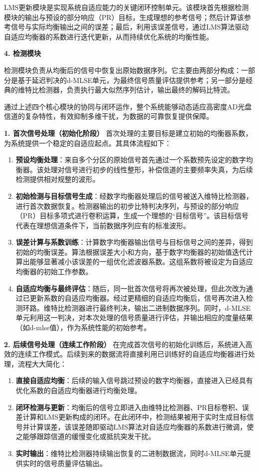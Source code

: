 LMS更新模块是实现系统自适应能力的关键闭环控制单元。该模块首先根据检测模块的输出与预设的部分响应（PR）目标，生成理想的参考信号；然后计算该参考信号与实际均衡输出之间的误差；最后，利用该误差信号，通过LMS算法驱动自适应均衡器的系数进行迭代更新，从而持续优化系统的均衡性能。

\textbf{4. 检测模块}

检测模块负责从均衡后的信号中恢复出原始数据序列。它主要由两部分构成：一部分是基于延迟判决的d-MLSE单元，为最终信号质量评估提供参考；另一部分是经典的维特比检测器，负责执行最大似然序列估计，输出最终的解码比特流。

通过上述四个核心模块的协同与闭环运作，整个系统能够动态适应高密度AD光盘信道的复杂特性，有效抑制多维干扰，为数据的可靠恢复提供保障。


\textbf{1. 首次信号处理（初始化阶段）}
首次处理的主要目标是建立初始的均衡器系数，为系统提供一个稳定的自适应起点。其具体流程如下：
\begin{enumerate}
	\item \textbf{预设均衡处理}：来自多个分区的原始信号首先通过一个系数预先设定的数字均衡器。该处理对信号进行初步的线性整形，补偿信道的主要频率失真，为后续检测提供相对规整的波形。
	\item \textbf{初始检测与目标信号生成}：经数字均衡器处理后的信号被送入维特比检测器，进行首次数据恢复。检测器输出的初步比特判决序列，与预设的部分响应（PR）目标多项式进行卷积运算，生成一个理想的“目标信号”。该目标信号代表在理想信道条件下，当前数据序列应有的标准波形。
	\item \textbf{误差计算与系数训练}：计算数字均衡器输出信号与目标信号之间的差异，得到初始的均衡误差。算法根据误差大小和方向，基于数字均衡器的初始值迭代计算出能够显著减小该误差的一组优化滤波器系数。这组系数将被设定为自适应均衡器的初始工作参数。
	\item \textbf{自适应均衡与最终评估}：随后，同一批首次信号将再次被处理，但此次改为通过已更新系数的自适应均衡器。经过更精细的自适应均衡后，信号再次进入检测环路。维特比检测器进行最终判决，输出二进制数据序列。同时，d-MLSE 单元利用这一判决，对本次处理的信号质量进行评估，并输出相应的度量结果（如d-mlse值），作为系统性能的初始参考。
\end{enumerate}

\textbf{2. 后续信号处理（连续工作阶段）}
在完成首次信号的初始化训练后，系统进入高效的连续工作模式。后续到来的数据流将直接利用已训练好的自适应均衡器进行处理，流程大大简化：
\begin{enumerate}
	\item \textbf{直接自适应均衡}：后续的输入信号跳过预设的数字均衡器，直接进入已经具有优化系数的自适应均衡器进行均衡处理。
	\item \textbf{闭环检测与更新}：均衡后的信号立即进入由维特比检测器、PR目标卷积、误差计算和LMS更新构成的闭环。在此闭环中，检测结果被用于实时生成目标信号并计算误差，该误差随即驱动LMS算法对自适应均衡器的系数进行微调，使之能够跟踪信道的缓慢变化或抵抗突发干扰。
	\item \textbf{实时输出}：维特比检测器持续输出恢复的二进制数据流，同时d-MLSE单元提供实时的信号质量评估输出。
\end{enumerate}

